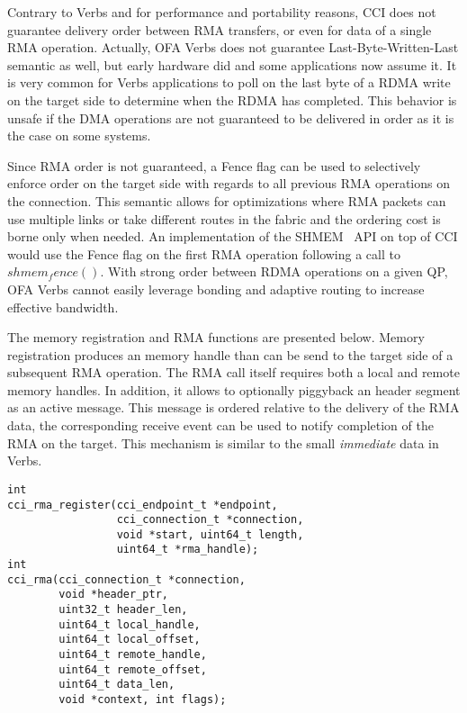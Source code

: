 Contrary to Verbs  and for performance and portability reasons, CCI does not guarantee delivery order between RMA transfers, or even for data of a single RMA operation. Actually, OFA Verbs does not guarantee Last-Byte-Written-Last semantic as well, but early hardware did and some applications now assume it. It is very common for Verbs applications to poll on the last byte of a RDMA write on the target side to determine when the RDMA has completed. This behavior is unsafe if the DMA operations are not guaranteed to be delivered in order as it is the case on some systems.

Since RMA order is not guaranteed, a Fence flag can be used to selectively 
enforce order on the target side with regards to all previous RMA operations 
on the connection. This semantic allows for optimizations where RMA packets 
can use multiple links or take different routes in the fabric and the ordering 
cost is borne only when needed. An implementation of the SHMEM~\cite{openshmem} API on top of CCI would use the Fence flag on the first RMA operation following a call to $shmem_fence()$. With strong order between RDMA operations on a given QP, OFA Verbs cannot easily leverage bonding and adaptive routing to increase effective bandwidth.

The memory registration and RMA functions are presented below. Memory registration produces an memory handle than can be send to the target side of a subsequent RMA operation. The RMA call itself requires both a local and remote memory handles. In addition, it allows to optionally piggyback an header segment as an active message. This message is ordered relative to the delivery of the RMA data, the corresponding receive event can be used to notify completion of the RMA on the target. This mechanism is similar to the small \emph{immediate} data in Verbs.

\lstset{language=C, frame=single, basicstyle=\small}
\begin{lstlisting}
int 
cci_rma_register(cci_endpoint_t *endpoint,
                 cci_connection_t *connection,
                 void *start, uint64_t length,
                 uint64_t *rma_handle);
int 
cci_rma(cci_connection_t *connection, 
        void *header_ptr, 
        uint32_t header_len, 
        uint64_t local_handle, 
        uint64_t local_offset, 
        uint64_t remote_handle, 
        uint64_t remote_offset,
        uint64_t data_len, 
        void *context, int flags);
\end{lstlisting}

